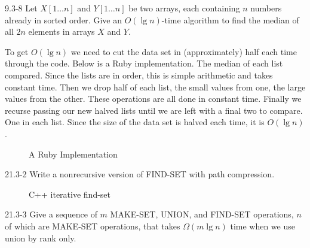 \begin{problem}{9.3-8}
  Let $X[1\ldots n]$ and $Y[1\ldots n]$ be two arrays, each containing $n$ numbers already in sorted order. Give an
  $O(\lg n)$-time algorithm to find the median of all $2n$ elements in arrays $X$ and $Y$.
  \begin{solution}
    To get $O(\lg n)$ we need to cut the data set in (approximately) half each time through the code. Below is a Ruby
    implementation. The median of each list compared. Since the lists are in order, this is simple arithmetic and takes
    constant time. Then we drop half of each list, the small values from one, the large values from the other. These
    operations are all done in constant time. Finally we recurse passing our new halved lists until we are left with a
    final two to compare. One in each list. Since the size of the data set is halved each time, it is $O(\lg n)$.
    \begin{figure}[H]
      \centering
      \caption{A Ruby Implementation}
      
    \end{figure}
  \end{solution}
\end{problem}

\begin{problem}{21.3-2}
  Write a nonrecursive version of FIND-SET with path compression.
  \begin{solution}
    \begin{figure}[H]
      \centering
      \caption{C++ iterative find-set}
      
    \end{figure}
  \end{solution}
\end{problem}

\begin{problem}{21.3-3}
  Give a sequence of $m$ MAKE-SET, UNION, and FIND-SET operations, $n$ of which are MAKE-SET operations, that takes
  $\Omega(m \lg n)$ time when we use union by rank only.
\end{problem}


